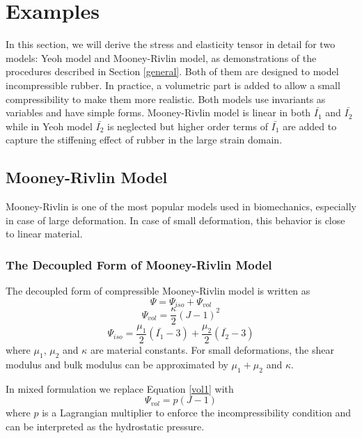 \section{Examples}
In this section, we will derive the stress and elasticity tensor in detail for two models: Yeoh model and Mooney-Rivlin model, as demonstrations of the procedures described in Section \ref{general}. Both of them are designed to model incompressible rubber. In practice, a volumetric part is added to allow a small compressibility to make them more realistic.  Both models use invariants as variables and have simple forms. Mooney-Rivlin model is linear in both $\bar{I_1}$ and $\bar{I_2}$ while in Yeoh model $\bar{I_2}$ is neglected but higher order terms of $\bar{I_1}$ are added to capture the stiffening effect of rubber in the large strain domain.

%
\subsection{Mooney-Rivlin Model}
Mooney-Rivlin is one of the most popular models used in biomechanics, especially in case of large deformation. In case of small deformation, this behavior is close to linear material.
\subsubsection{The Decoupled Form of Mooney-Rivlin Model}
The decoupled form of compressible Mooney-Rivlin model is written as
\begin{equation}
\Psi = \Psi_{iso} + \Psi_{vol}
\end{equation}
\begin{equation} \label{vol1}
\Psi_{vol} = \frac{\kappa}{2}(J - 1)^2
\end{equation}
\begin{equation} \label{iso}
\Psi_{iso} = \frac{\mu_1}{2}(\bar{I_1} - 3) + \frac{\mu_2}{2}(\bar{I_2} - 3)
\end{equation}
where $\mu_1$, $\mu_2$ and $\kappa$ are material constants. For small deformations, the shear modulus and bulk modulus can be approximated by $\mu_1+\mu_2$ and $\kappa$.

In mixed formulation we replace Equation \ref{vol1} with
\begin{equation} \label{vol2}
\Psi_{vol} = p(J - 1)
\end{equation}
where $p$ is a Lagrangian multiplier to enforce the incompressibility condition and can be interpreted as the hydrostatic pressure.  


